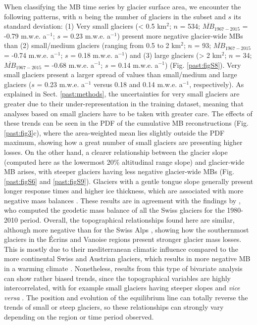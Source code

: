 When classifying the MB time series by glacier surface area, we encounter the following patterns, with $n$ being the number of glaciers in the subset and $s$ its standard deviation: (1) Very small glaciers (< 0.5 km$^{2}$; $n$ = 534; $\overline{MB}_{1967-2015}$ = -0.79 m.w.e. a$^{-1}$; $s$ = 0.23 m.w.e. a$^{-1}$) present more negative glacier-wide MBs than (2) small/medium glaciers (ranging from 0.5 to 2 km$^{2}$; $n$ = 93; $\overline{MB}_{1967-2015}$ = -0.74 m.w.e. a$^{-1}$; $s$ = 0.18 m.w.e. a$^{-1}$) and (3) large glaciers (> 2 km$^{2}$; $n$ = 34; $\overline{MB}_{1967-2015}$ = -0.68 m.w.e. a$^{-1}$; $s$ = 0.14 m.w.e. a$^{-1}$) (Fig. \ref{past:figS8}). Very small glaciers present a larger spread of values than small/medium and large glaciers ($s$ = 0.23 m.w.e. a$^{-1}$ versus 0.18 and 0.14 m.w.e. a$^{-1}$, respectively). As explained in Sect. \ref{past:methods}, the uncertainties for very small glaciers are greater due to their under-representation in the training dataset, meaning that analyses based on small glaciers have to be taken with greater care. The effects of these trends can be seen in the PDF of the cumulative MB reconstructions (Fig. \ref{past:fig3}c), where the area-weighted mean lies slightly outside the PDF maximum, showing how a great number of small glaciers are presenting higher losses. On the other hand, a clearer relationship between the glacier slope (computed here as the lowermost 20\% altitudinal range slope) and glacier-wide MB arises, with steeper glaciers having less negative glacier-wide MBs (Fig. \ref{past:figS6} and \ref{past:figS9}). Glaciers with a gentle tongue slope generally present longer response times and higher ice thickness, which are associated with more negative mass balances \citep{hoelzle_secular_2003, huss_sensitivity_2016, zekollari_imbalance_2020}. These results are in agreement with the findings by \citet{fischer_surface_2015}, who computed the geodetic mass balance of all the Swiss glaciers for the 1980-2010 period. Overall, the topographical relationships found here are similar, although more negative than for the Swiss Alps \citep{huss_extrapolating_2012, huss_new_2015-2}, showing how the southernmost glaciers in the Écrins and Vanoise regions present stronger glacier mass losses. This is mostly due to their mediterranean climatic influence compared to the more continental Swiss and Austrian glaciers, which results in more negative MB in a warming climate \citep{oerlemans_relating_2000}. Nonetheless, results from this type of bivariate analysis can show rather biased trends, since the topographical variables are highly intercorrelated, with for example small glaciers having steeper slopes and \textit{vice versa} \citep{gardent_multitemporal_2014}. The position and evolution of the equilibrium line can totally reverse the trends of small or steep glaciers, so these relationships can strongly vary depending on the region or time period observed. 


